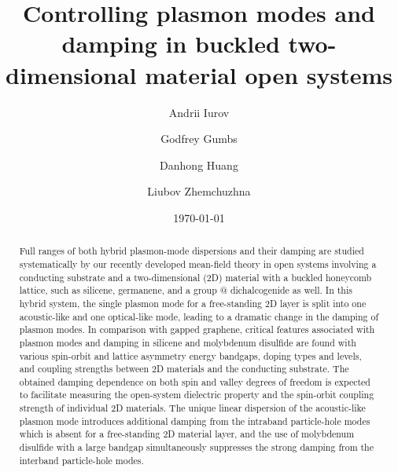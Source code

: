 \documentclass[aps,prb,showpacs]{revtex4}
\makeatletter
\newcommand*{\rom}[1]{\expandafter\@slowromancap\romannumeral #1@}
\makeatother
\begin{document}
\title{Controlling plasmon modes and damping in buckled two-dimensional material open systems}

\author{Andrii Iurov}
\author{Godfrey Gumbs}
\author{Danhong Huang}
\author{Liubov Zhemchuzhna}

\date{\today}

\begin{abstract}
Full ranges of both hybrid plasmon-mode dispersions and their damping are studied systematically by our recently developed mean-field theory in open systems involving a conducting substrate and 
a two-dimensional (2D) material 
with a buckled honeycomb lattice, such as silicene, germanene, and a group \rom{4} dichalcogenide as well.
In this hybrid system, the single plasmon mode for a free-standing 2D layer is split into one acoustic-like and one optical-like mode, leading to a dramatic change in the damping of plasmon modes.  
In comparison with gapped graphene, critical features associated with plasmon modes and damping in silicene and molybdenum disulfide are found 
with various spin-orbit and lattice asymmetry energy bandgaps, doping types and levels, and coupling strengths between 2D materials and the conducting substrate. 
The obtained damping dependence on both spin and valley degrees of freedom is expected to facilitate measuring the open-system dielectric property and the spin-orbit coupling strength of individual 2D materials. 
The unique linear dispersion of the acoustic-like plasmon mode introduces additional damping from the intraband particle-hole modes which is absent for a free-standing 2D material layer,  
and the use of molybdenum disulfide with a large bandgap simultaneously suppresses the strong damping from the interband particle-hole modes.
\end{abstract}
\end{document}
